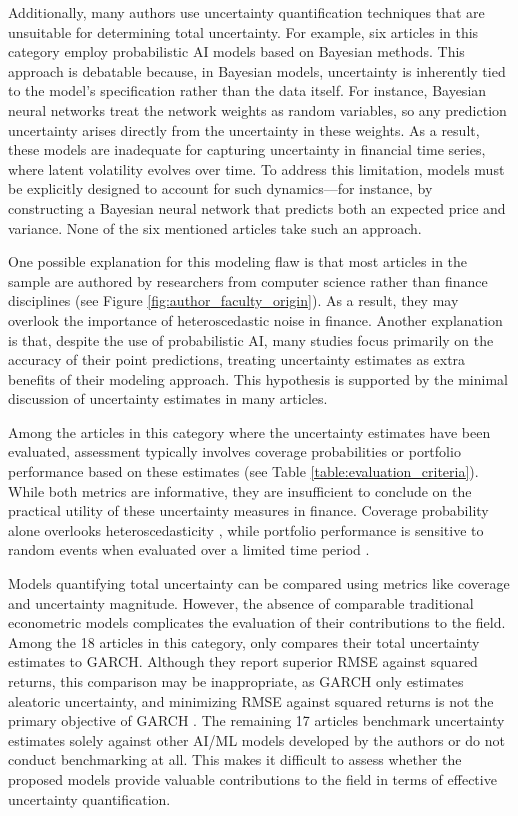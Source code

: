 Additionally, many authors use uncertainty quantification techniques that are unsuitable for determining total uncertainty. For example, six articles in this category employ probabilistic AI models based on Bayesian methods. This approach is debatable because, in Bayesian models, uncertainty is inherently tied to the model's specification rather than the data itself. For instance, Bayesian neural networks treat the network weights as random variables, so any prediction uncertainty arises directly from the uncertainty in these weights. As a result, these models are inadequate for capturing uncertainty in financial time series, where latent volatility evolves over time. To address this limitation, models must be explicitly designed to account for such dynamics—for instance, by constructing a Bayesian neural network that predicts both an expected price and variance. None of the six mentioned articles take such an approach.

One possible explanation for this modeling flaw is that most articles in the sample are authored by researchers from computer science rather than finance disciplines (see Figure \ref{fig:author_faculty_origin}). As a result, they may overlook the importance of heteroscedastic noise in finance. Another explanation is that, despite the use of probabilistic AI, many studies focus primarily on the accuracy of their point predictions, treating uncertainty estimates as extra benefits of their modeling approach. This hypothesis is supported by the minimal discussion of uncertainty estimates in many articles.

Among the articles in this category where the uncertainty estimates have been evaluated, assessment typically involves coverage probabilities or portfolio performance based on these estimates (see Table \ref{table:evaluation_criteria}). While both metrics are informative, they are insufficient to conclude on the practical utility of these uncertainty measures in finance. Coverage probability alone overlooks heteroscedasticity \parencite{Christoffersen1998}, while portfolio performance is sensitive to random events when evaluated over a limited time period \parencite{barras2010}.

Models quantifying total uncertainty can be compared using metrics like coverage and uncertainty magnitude. However, the absence of comparable traditional econometric models complicates the evaluation of their contributions to the field. Among the 18 articles in this category, only \textcite{Platanios2014gpr} compares their total uncertainty estimates to GARCH. Although they report superior RMSE against squared returns, this comparison may be inappropriate, as GARCH only estimates aleatoric uncertainty, and minimizing RMSE against squared returns is not the primary objective of GARCH \parencite{BOLLERSLEV1986GARCH}. The remaining 17 articles benchmark uncertainty estimates solely against other AI/ML models developed by the authors or do not conduct benchmarking at all. This makes it difficult to assess whether the proposed models provide valuable contributions to the field in terms of effective uncertainty quantification.

